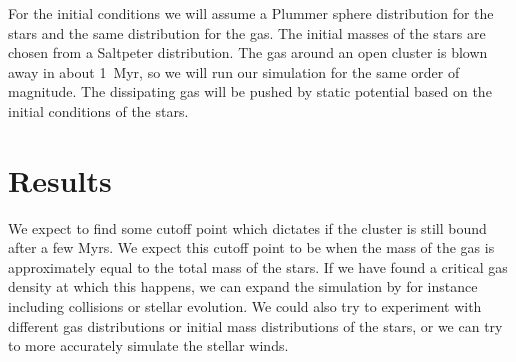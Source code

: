 \documentclass[12pt]{article}
\begin{document}
For the initial conditions we will assume a Plummer sphere distribution for the stars and the same distribution for the gas. The initial masses of the stars are chosen from a Saltpeter distribution. The gas around an open cluster is blown away in about \SI{1}{\mega yr}, so we will run our simulation for the same order of magnitude. The dissipating gas will be pushed by static potential based on the initial conditions of the stars.


\section{Results}
We expect to find some cutoff point which dictates if the cluster is still bound after a few Myrs. We expect this cutoff point to be when the mass of the gas is approximately equal to the total mass of the stars. If we have found a critical gas density at which this happens, we can expand the simulation by for instance including collisions or stellar evolution. We could also try to experiment with different gas distributions or initial mass distributions of the stars, or we can try to more accurately simulate the stellar winds. 





\printbibliography


% 


% 
\end{document}
